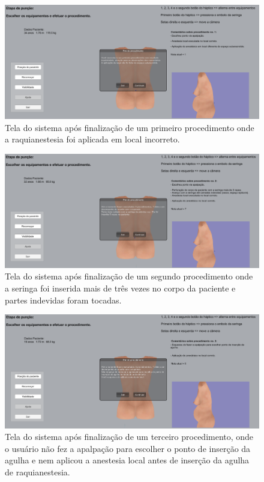 \begin{figure}[ht!]
    \centering
    \includegraphics[width=\textwidth]{capitulos/figuras/sistema-exemplo-execucao-procedimento-1.png} 
    \caption{Tela do sistema após finalização de um primeiro procedimento onde a raquianestesia foi aplicada em local incorreto.}
    \label{fig:sistemaExecucao1RaquiLocalIncorreto}
\end{figure}

\begin{figure}[ht!]
    \centering
    \includegraphics[width=\textwidth]{capitulos/figuras/sistema-exemplo-execucao-procedimento-2.png} 
    \caption{Tela do sistema após finalização de um segundo procedimento onde a seringa foi inserida mais de três vezes no corpo da paciente e partes indevidas foram tocadas.}
    \label{fig:sistemaExecucao2seringaCorreto}
\end{figure}

\begin{figure}[ht!]
    \centering
    \includegraphics[width=\textwidth]{capitulos/figuras/sistema-exemplo-execucao-procedimento-3.png} 
    \caption{Tela do sistema após finalização de um terceiro procedimento, onde o usuário não fez a apalpação para escolher o ponto de inserção da agulha e nem aplicou a anestesia local antes de inserção da agulha de raquianestesia.}
    \label{fig:sistemaExecucao3faltouApalpacaoAnestesiaLocalIncorreto}
\end{figure}

